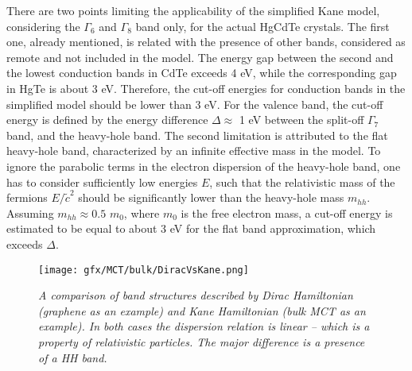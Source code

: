 \documentclass[titlepage,a4paper]{book}
\begin{document}
There are two points limiting the applicability of the simplified Kane model, considering the $\Gamma_6$ and $\Gamma_8$ band only, for the actual HgCdTe crystals. The first one, already mentioned, is related with the presence of other bands, considered as remote and not included in the model. The energy gap between the second and the lowest conduction bands in CdTe exceeds 4 eV, while the corresponding gap in HgTe is about 3 eV. Therefore, the cut-off energies for conduction bands in the simplified model should be lower than 3 eV. For the valence band, the cut-off energy is defined by the energy difference $\Delta \approx$ 1 eV between the split-off $\Gamma_7$ band, and the heavy-hole band. The second limitation is attributed to the flat heavy-hole band, characterized by an infinite effective mass in the model. To ignore the parabolic terms in the electron dispersion of the heavy-hole band, one has to consider sufficiently low energies $E$, such that the relativistic mass of the fermions $E/\tilde{c}^2$ should be significantly lower than the heavy-hole mass $m_{hh}$. Assuming $m_{hh} \approx 0.5$ $m_0$, where $m_0$ is the free electron mass, a cut-off energy is estimated to be equal to about 3 eV for the flat band approximation, which exceeds $\Delta$.
\begin{figure}[ht]
	\centering
	\texttt{[image: gfx/MCT/bulk/DiracVsKane.png]}
	\vspace{-10pt}
	\caption{\textit{A comparison of band structures described by Dirac Hamiltonian (graphene as an example) and Kane Hamiltonian (bulk MCT as an example). In both cases the dispersion relation is linear -- which is a property of relativistic particles. The major difference is a presence of a HH band.}}
	\label{fig:DiracVsKane}
\end{figure}

\end{document}
